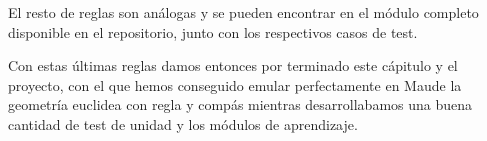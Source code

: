 El resto de reglas son análogas y se pueden encontrar en el módulo completo disponible en el repositorio, junto con los respectivos casos de test. \par

Con estas últimas reglas damos entonces por terminado este cápitulo y el proyecto, con el que hemos conseguido emular perfectamente en Maude la geometría euclidea con regla y compás mientras desarrollabamos una buena cantidad de test de unidad y los módulos de aprendizaje. \par

